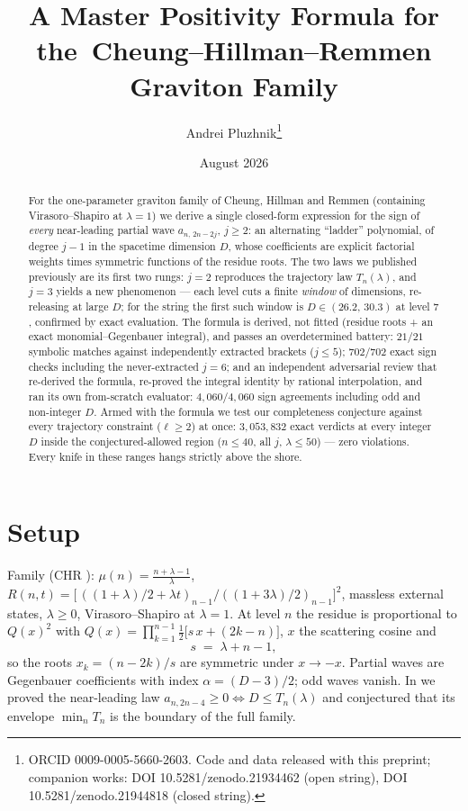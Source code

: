 \documentclass[11pt]{article}
\title{A Master Positivity Formula for the\ Cheung--Hillman--Remmen Graviton Family}
\author{Andrei Pluzhnik\thanks{ORCID 0009-0005-5660-2603. Code and data
released with this preprint; companion works: DOI 10.5281/zenodo.21934462
(open string), DOI 10.5281/zenodo.21944818 (closed string).}}
\date{August 2026}
\begin{document}
\maketitle

\begin{abstract}
For the one-parameter graviton family of Cheung, Hillman and Remmen
(containing Virasoro--Shapiro at $\lambda=1$) we derive a single closed-form
expression for the sign of \emph{every} near-leading partial wave
$a_{n,\,2n-2j}$, $j\ge2$: an alternating ``ladder'' polynomial, of degree
$j{-}1$ in the spacetime dimension $D$, whose coefficients are explicit
factorial weights times symmetric functions of the residue roots. The two
laws we published previously are its first two rungs: $j{=}2$ reproduces the
trajectory law $T_n(\lambda)$, and $j{=}3$ yields a new phenomenon --- each
level cuts a finite \emph{window} of dimensions, re-releasing at large $D$;
for the string the first such window is $D\in(26.2,\,30.3)$ at level $7$,
confirmed by exact evaluation. The formula is derived, not fitted (residue
roots + an exact monomial--Gegenbauer integral), and passes an
overdetermined battery: $21/21$ symbolic matches against independently
extracted brackets ($j\le5$); $702/702$ exact sign checks including the
never-extracted $j{=}6$; and an independent adversarial review that
re-derived the formula, re-proved the integral identity by rational
interpolation, and ran its own from-scratch evaluator: $4{,}060/4{,}060$
sign agreements including odd and non-integer $D$. Armed with the formula we
test our completeness conjecture against every trajectory constraint
($\ell\ge2$) at once: $3{,}053{,}832$ exact verdicts at every integer $D$
inside the conjectured-allowed region ($n\le40$, all $j$, $\lambda\le50$)
--- zero violations. Every knife in these ranges hangs strictly above the
shore.
\end{abstract}

\section{Setup}
Family (CHR \cite{CHR2024b}): $\mu(n)=\frac{n+\lambda-1}{\lambda}$,
$R(n,t)=\bigl[\,((1{+}\lambda)/2+\lambda t)_{n-1}/((1{+}3\lambda)/2)_{n-1}\bigr]^2$,
massless external states, $\lambda\ge0$, Virasoro--Shapiro at $\lambda=1$.
At level $n$ the residue is proportional to $Q(x)^2$ with
$Q(x)=\prod_{k=1}^{n-1}\tfrac12\bigl[s\,x+(2k{-}n)\bigr]$, $x$ the scattering
cosine and
\begin{equation}
s\;=\;\lambda+n-1 ,
\end{equation}
so the roots $x_k=(n-2k)/s$ are symmetric under $x\to-x$. Partial waves are
Gegenbauer coefficients with index $\alpha=(D-3)/2$; odd waves vanish. In
\cite{shore} we proved the near-leading law
$a_{n,2n-4}\ge0\iff D\le T_n(\lambda)$ and conjectured that its envelope
$\min_nT_n$ is the boundary of the full family.
\end{document}
